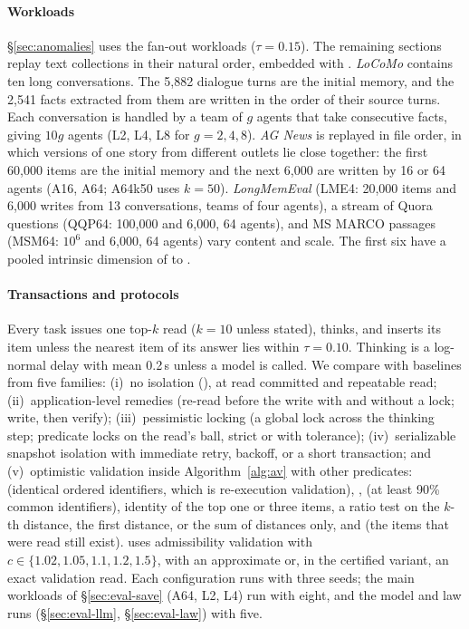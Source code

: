 \documentclass[sigconf, nonacm, review]{acmart}
\begin{document}
\paragraph{Workloads}
\S\ref{sec:anomalies} uses the fan-out workloads ($\tau=0.15$). The remaining
sections replay text collections in their natural order, embedded with
 \cite{DBLP:conf/emnlp/ReimersG19,DBLP:conf/acl/ChenXZLLL24,wordllama}.
\emph{LoCoMo} \cite{DBLP:conf/acl/MaharanaLTBBF24} contains ten long conversations. The 5{,}882
dialogue turns are the initial memory, and the 2{,}541 facts extracted
from them are written in the order of their source turns. Each
conversation is handled by a team of $g$ agents that take consecutive
facts, giving $10g$ agents (L2, L4, L8 for $g=2,4,8$).
\emph{AG News} \cite{DBLP:conf/nips/ZhangZL15} is replayed in file order, in which versions of
one story from different outlets lie close together: the first
60{,}000 items are the initial memory and the next 6{,}000 are written
by 16 or 64 agents (A16, A64; A64k50 uses $k=50$).
\emph{LongMemEval} \cite{DBLP:conf/iclr/WuWYZCY25} (LME4: 20{,}000 items and
6{,}000 writes from 13 conversations, teams of four agents), a stream of
Quora questions \cite{DBLP:conf/iclr/WangSMHLB19} (QQP64: 100{,}000 and
6{,}000, 64 agents), and MS MARCO passages
\cite{DBLP:journals/corr/abs-1611-09268} (MSM64: $10^6$ and 6{,}000, 64
agents) vary content and scale. The first six
have a pooled intrinsic dimension
\cite{DBLP:conf/nips/LevinaB04,DBLP:conf/kdd/AmsalegCFGHKN15} of
 to .

\paragraph{Transactions and protocols}
Every task issues one top-$k$ read ($k=10$ unless stated), thinks, and
inserts its item unless the nearest item of its answer lies within
$\tau=0.10$. Thinking is a log-normal delay with mean 0.2\,s unless a
model is called. We compare \sys{} with 
baselines from five families: (i)~no isolation (), at read committed and repeatable read;
(ii)~application-level remedies (re-read before the write with and
without a lock; write, then verify); (iii)~pessimistic locking (a
global lock across the thinking step; predicate locks on the read's
ball, strict or with tolerance); (iv)~serializable snapshot isolation
with immediate retry, backoff, or a short transaction; and
(v)~optimistic validation inside Algorithm~\ref{alg:av} with other
predicates:  (identical ordered identifiers, which is
re-execution validation), ,  (at least 90\%
common identifiers), identity of the top one or three items, a ratio
test on the $k$-th distance, the first distance, or the sum of
distances only, and  (the items that were read still
exist). \sys{} uses admissibility validation with
$c\in\{1.02,1.05,1.1,1.2,1.5\}$, with an approximate or, in the
certified variant, an exact validation read. Each configuration runs
with three seeds; the main workloads of \S\ref{sec:eval-save} (A64,
L2, L4) run with eight, and the model and law runs
(\S\ref{sec:eval-llm}, \S\ref{sec:eval-law}) with five.
\end{document}
